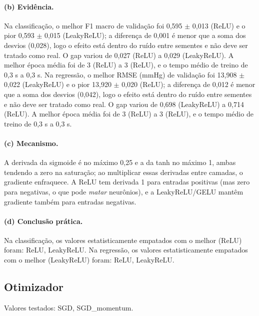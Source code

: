 \documentclass[11pt,a4paper]{article}
\begin{document}
\paragraph{(b) Evidência.} Na classificação, o melhor F1 macro de validação foi 0,595 $\pm$ 0,013 (ReLU) e o pior 0,593 $\pm$ 0,015 (LeakyReLU); a diferença de 0,001 é menor que a soma dos desvios (0,028), logo o efeito está dentro do ruído entre sementes e não deve ser tratado como real. O gap variou de 0,027 (ReLU) a 0,029 (LeakyReLU). A melhor época média foi de 3 (ReLU) a 3 (ReLU), e o tempo médio de treino de 0,3 s a 0,3 s. Na regressão, o melhor RMSE (mmHg) de validação foi 13,908 $\pm$ 0,022 (LeakyReLU) e o pior 13,920 $\pm$ 0,020 (ReLU); a diferença de 0,012 é menor que a soma dos desvios (0,042), logo o efeito está dentro do ruído entre sementes e não deve ser tratado como real. O gap variou de 0,698 (LeakyReLU) a 0,714 (ReLU). A melhor época média foi de 3 (ReLU) a 3 (ReLU), e o tempo médio de treino de 0,3 s a 0,3 s.

\paragraph{(c) Mecanismo.} A derivada da sigmoide é no máximo 0,25 e a da tanh no máximo 1, ambas tendendo a zero na saturação; ao multiplicar essas derivadas entre camadas, o gradiente enfraquece. A ReLU tem derivada 1 para entradas positivas (mas zero para negativas, o que pode \emph{matar} neurônios), e a LeakyReLU/GELU mantêm gradiente também para entradas negativas.

\paragraph{(d) Conclusão prática.} Na classificação, os valores estatisticamente empatados com o melhor (ReLU) foram: ReLU, LeakyReLU.  Na regressão, os valores estatisticamente empatados com o melhor (LeakyReLU) foram: ReLU, LeakyReLU. 

\subsection{Otimizador}
Valores testados: SGD, SGD\_momentum.
\end{document}
